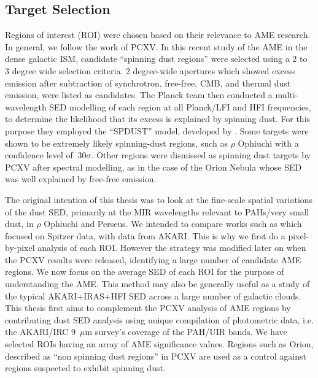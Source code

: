 \subsection{Target Selection}
     Regions of interest (ROI) were chosen based on their relevance to AME research. In general, we follow the work of PCXV. In this recent study of the AME in the dense galactic ISM, candidate “spinning dust regions” were selected using a 2 to 3 degree wide selection criteria. 2 degree-wide apertures which showed excess emission after subtraction of synchrotron, free-free, CMB, and thermal dust emission, were listed as candidates. The Planck team then conducted a multi-wavelength SED modelling of each region at all Planck/LFI and HFI frequencies, to determine the likelihood that its excess is explained by spinning dust. For this purpose they employed the ``SPDUST” model, developed by \cite{ali-hamoud09}. Some targets were shown to be extremely likely spinning-dust regions, such as $\rho$ Ophiuchi with a confidence level of $~30\sigma$. Other regions were dismissed as spinning dust targets by PCXV after spectral modelling, as in the case of the Orion Nebula whose SED was well explained by free-free emission. \par    
     The original intention of this thesis was to look at the fine-scale spatial variations of the dust SED, primarily at the MIR wavelengths relevant to PAHs/very small dust, in $\rho$ Ophiuchi and Perseus. We intended to compare works such as \cite{tibbs11} which focused on Spitzer data, with data from AKARI. This is why we first do a pixel-by-pixel analysis of each ROI. However the strategy was modified later on when the PCXV results were released, identifying a large number of candidate AME regions. We now focus on the average SED of each ROI for the purpose of understanding the AME. This method may also be generally useful as a study of the typical AKARI+IRAS+HFI SED across a large number of galactic clouds.
     This thesis first aims to complement the PCXV analysis of AME regions by contributing dust SED analysis using unique compilation of photometric data, i.e. the AKARI/IRC 9~$\mu$m survey’s coverage of the PAH/UIR bands. We have selected ROIs having an array of AME significance values. Regions such as Orion, described as “non spinning dust regions” in PCXV are used as a control against regions suspected to exhibit spinning dust.

